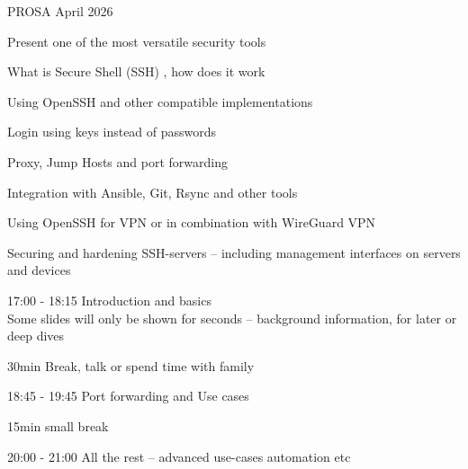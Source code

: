 \documentclass[Screen16to9,17pt]{foils}
\begin{document}
{PROSA April 2026}


\hlkprofiluk




Present one of the most versatile security tools
\begin{list2}
\item What is Secure Shell (SSH) , how does it work
\item Using OpenSSH and other compatible implementations
\item Login using keys instead of passwords
\item Proxy, Jump Hosts and port forwarding
\item Integration with Ansible, Git, Rsync and other tools
\item Using OpenSSH for VPN or in combination with WireGuard VPN
\item Securing and hardening SSH-servers -- including management interfaces on servers and devices
\end{list2}



\begin{list2}
\item 17:00 - 18:15 Introduction and basics\\
Some slides will only be shown for seconds -- background information, for later or deep dives
\item 30min Break, talk or spend time with family
\item 18:45 - 19:45 Port forwarding and Use cases
\item 15min small break
\item 20:00 - 21:00 All the rest -- advanced use-cases automation etc
\end{list2}


\end{document}
